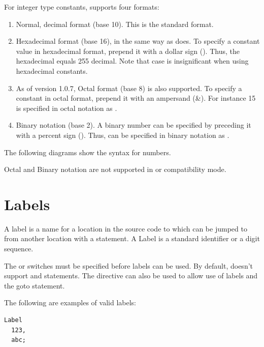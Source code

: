 For integer type constants, \fpc supports four formats:
\begin{enumerate}
\item Normal, decimal format (base 10). This is the standard
format.
\item Hexadecimal format (base 16), in the same way as \tp does.
To specify a constant value in hexadecimal format, prepend it with a dollar
sign (\var{\$}). Thus, the hexadecimal  equals 255 decimal.
Note that case is insignificant when using hexadecimal constants.
\item As of version 1.0.7, Octal format (base 8) is also supported.
To specify a constant in octal format, prepend it with an ampersand (\&).
For instance 15 is specified in octal notation as
.
\item Binary notation (base 2). A binary number can be specified
by preceding it with a percent sign (\var{\%}). Thus,  can be
specified in binary notation as .
\end{enumerate}
The following diagrams show the syntax for numbers.



\begin{remark}
Octal and Binary notation are not supported in  or 
compatibility mode.
\end{remark}

\section{Labels}
 
A label is a name for a location in the source code to which can be
jumped to from another location with a  statement. A Label is a
standard identifier or a digit sequence.

\begin{remark}
The  or  switches must be specified before
labels can be used. By default, \fpc doesn't support  and
 statements. The  directive can also be used
to allow use of labels and the goto statement.
\end{remark}
The following are examples of valid labels:
\begin{verbatim}
Label
  123,
  abc;
\end{verbatim}
